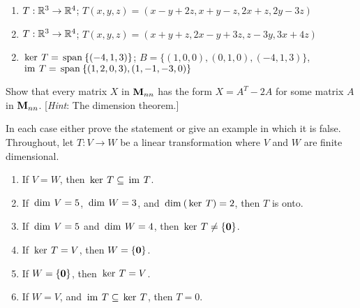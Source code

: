 \begin{multicols}{2}
\begin{ex}
\begin{enumerate}[label={\alph*.}]
\item $T : \mathbb{R}^3 \to \mathbb{R}^4$; $T(x, y, z) = (x - y + 2z, x + y - z, 2x + z, 2y - 3z)$

\item $T : \mathbb{R}^3 \to \mathbb{R}^4$; $T(x, y, z) = (x + y + z, 2x - y + 3z, z - 3y, 3x + 4z)$

\end{enumerate}
\begin{sol}
\begin{enumerate}[label={\alph*.}]
\setcounter{enumi}{1}
\item $\thinspace\operatorname{ker \medspace}T = \thinspace\operatorname{span\medspace}\{(-4, 1, 3)\}$; $B = \{(1, 0, 0), (0, 1, 0), (-4, 1, 3)\}$, $\thinspace\operatorname{im \medspace}T = \thinspace\operatorname{span\medspace}\{(1, 2, 0, 3), (1, -1, -3, 0)\}$

\end{enumerate}
\end{sol}
\end{ex}

\begin{ex}
Show that every matrix $X$ in $\textbf{M}_{nn}$ has the form $X = A^{T} - 2A$ for some matrix $A$ in $\textbf{M}_{nn}$. [\textit{Hint}: The dimension theorem.]
\end{ex}

\begin{ex}
In each case either prove the statement or give an example in which it is false. Throughout, let $T : V \to W$ be a linear transformation where $V$ and $W$ are finite dimensional.


\begin{enumerate}[label={\alph*.}]
\item If $V = W$, then $\thinspace\operatorname{ker \medspace}T \subseteq \thinspace\operatorname{im \medspace}T$.

\item If $\thinspace\operatorname{dim \medspace}V = 5$, $\thinspace\operatorname{dim \medspace}W = 3$, and $\thinspace\operatorname{dim\medspace}(\thinspace\operatorname{ker \medspace}T) = 2$, then $T$ is onto.

\item If $\thinspace\operatorname{dim \medspace}V = 5$ and $\thinspace\operatorname{dim \medspace}W = 4$, then $\thinspace\operatorname{ker \medspace}T \neq \{\textbf{0}\}$.

\item If $\thinspace\operatorname{ker \medspace}T = V$, then $W = \{\textbf{0}\}$.

\item If $W = \{\textbf{0}\}$, then $\thinspace\operatorname{ker \medspace}T = V$.

\item If $W = V$, and $\thinspace\operatorname{im \medspace}T \subseteq \thinspace\operatorname{ker \medspace}T$, then $T = 0$.


\end{enumerate}
\end{ex}
\end{multicols}
